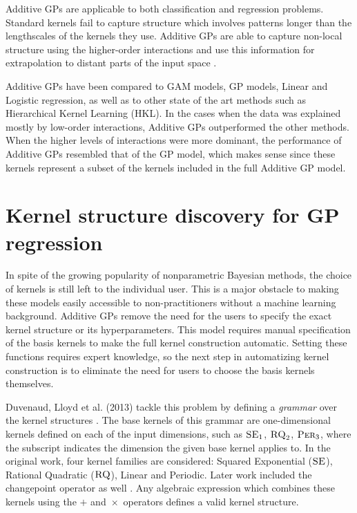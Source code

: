 \documentclass[a4paper,12pt ]{report}
\newcommand{\kerntimes}{ \! \times \!}
\renewcommand{\GP}{{GP}}
\begin{document}
Additive GPs are applicable to both classification and regression problems. Standard {\SE} kernels fail to capture structure which involves patterns longer than the lengthscales of the kernels they use. Additive {\GP}s are able to capture non-local structure using the higher-order interactions and use this information for  extrapolation to distant parts of the input space \cite{duvenaud2011additive11}.

Additive {\GP}s have been compared to GAM models, {\GP} {\SE} models, Linear and Logistic regression, as well as to other state of the art methods such as Hierarchical Kernel Learning (HKL). In the cases when the data was explained mostly by low-order interactions, Additive {\GP}s outperformed the other methods. When the higher levels of interactions were more dominant, the performance of Additive {\GP}s resembled that of the {\GP} {\SE} model, which makes sense since these kernels represent a subset of the kernels included in the full Additive {\GP} model.


\section{Kernel structure discovery for GP regression}

In spite of the growing popularity of nonparametric Bayesian methods, the choice of kernels is still left to the individual user. This is a major obstacle to making these models easily accessible to non-practitioners without a machine learning background. Additive {\GP}s remove the need for the users to specify the exact kernel structure or its hyperparameters. This model requires manual specification of the basis kernels to make the full kernel construction automatic. Setting these functions requires expert knowledge, so the next step in automatizing kernel construction is to eliminate the need for users to choose the basis kernels themselves.

Duvenaud, Lloyd et al. (2013) tackle this problem by defining a \emph{grammar} over the kernel structures \cite{duvenaud13}. The base kernels of this grammar are one-dimensional kernels defined on each of the input dimensions, such as $\textsc{SE}_1$, $\textsc{RQ}_2$, $\textsc{Per}_3$, where the subscript indicates the dimension the given base kernel applies to. In the original work, four kernel families are considered: Squared Exponential ($\textsc{SE}$), Rational Quadratic ($\textsc{RQ}$), Linear and Periodic. Later work included the changepoint operator as well \cite{lloyd14}. Any algebraic expression which combines these kernels using the $+$ and $\kerntimes$ operators defines a valid kernel structure.
\end{document}
